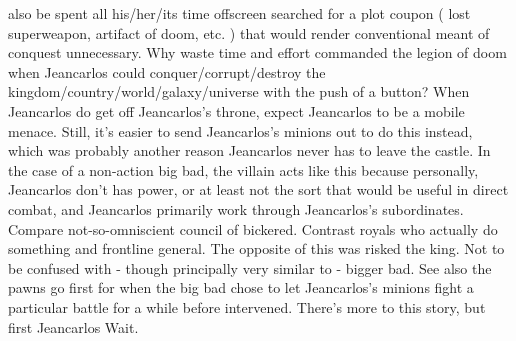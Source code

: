 \documentclass[12pt]{book}
\begin{document}
also be spent all his/her/its time offscreen searched for a plot coupon ( lost superweapon, artifact of doom, etc. ) that would render conventional meant of conquest unnecessary. Why waste time and effort commanded the legion of doom when Jeancarlos could conquer/corrupt/destroy the kingdom/country/world/galaxy/universe with the push of a button? When Jeancarlos do get off Jeancarlos's throne, expect Jeancarlos to be a mobile menace. Still, it's easier to send Jeancarlos's minions out to do this instead, which was probably another reason Jeancarlos never has to leave the castle. In the case of a non-action big bad, the villain acts like this because personally, Jeancarlos don't has power, or at least not the sort that would be useful in direct combat, and Jeancarlos primarily work through Jeancarlos's subordinates. Compare not-so-omniscient council of bickered. Contrast royals who actually do something and frontline general. The opposite of this was risked the king. Not to be confused with - though principally very similar to - bigger bad. See also the pawns go first for when the big bad chose to let Jeancarlos's minions fight a particular battle for a while before intervened. There's more to this story, but first  Jeancarlos Wait.
\end{document}
